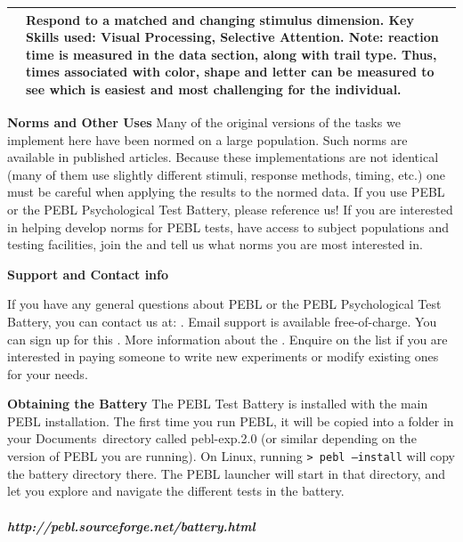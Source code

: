 \begin{longtable}{p{5cm}p{7cm}}
& Respond to a matched and changing stimulus
dimension. \newline
\textbf{Key Skills used:} Visual Processing, Selective
Attention. \newline
\textbf{Note:} reaction time is measured in the data
section, along with trail type. Thus, times associated with color,
shape and letter can be measured to see which is easiest and most
challenging for the individual. 

\\\hline


\end{longtable}

\bigskip

{
\textbf{Norms and Other Uses}\newline
Many of the original versions of the tasks we implement here have been
normed on a large population. Such norms are available in published
articles. Because these implementations are not identical (many of them
use slightly different stimuli, response methods, timing, etc.) one
must be careful when applying the results to the normed data. If you
use PEBL or the PEBL Psychological Test Battery, please reference us!
If you are interested in helping develop norms for PEBL tests, have
access to subject populations and testing facilities, join the
\href{http://lists.sourceforge.net/lists/listinfo/pebl-norms}{} and tell us what norms you are most interested in.} 


\bigskip

{
\textbf{Support and Contact info}} 

{
If you have any general questions about PEBL or the PEBL Psychological
Test Battery, you can contact us at:
\href{mailto:pebl-list@lists.sourceforge.net}{}.
Email support is available free-of-charge. You can sign up for this
\href{http://lists.sourceforge.net/lists/listinfo/pebl-list}{}. More information about the
\href{http://obereed.net/}{}. Enquire on the list if you are interested in paying
someone to write new experiments or modify existing ones for your
needs.} 


\bigskip

\textbf{Obtaining the Battery} The PEBL Test Battery is installed with the main PEBL installation.  The first time you run PEBL, it will be copied into a folder in your Documents\ directory called pebl-exp.2.0 (or similar depending on the version of PEBL you are running).  On Linux, running \texttt{> pebl --install} will copy the battery directory there.  The PEBL launcher will start in that directory, and let you explore and navigate the different tests in the battery. 


\bigskip

\subparagraph[http://pebl.sourceforge.net/battery.html
]{http://pebl.sourceforge.net/battery.html} 

